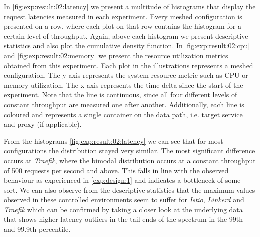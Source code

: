 In \cref{fig:exp:result:02:latency} we present a multitude of histograms that display the request latencies measured in each experiment. Every meshed configuration is presented on a row, where each plot on that row contains the histogram for a certain level of throughput. Again, above each histogram we present descriptive statistics and also plot the cumulative density function. In \cref{fig:exp:result:02:cpu} and \cref{fig:exp:result:02:memory} we present the resource utilization metrics obtained from this experiment. Each plot in the illustrations represents a meshed configuration. The y-axis represents the system resource metric such as CPU or memory utilization. The x-axis represents the time delta since the start of the experiment. Note that the line is continuous, since all four different levels of constant throughput are measured one after another. Additionally, each line is coloured and represents a single container on the data path, i.e. target service and proxy (if applicable).

From the histograms \cref{fig:exp:result:02:latency} we can see that for most configurations the distribution stayed very similar. The most significant difference occurs at \textit{Traefik}, where the bimodal distribution occurs at a constant throughput of 500 requests per second and above. This falls in line with the observed behaviour as experienced in \ref{exp:design:1} and indicates a bottleneck of some sort. We can also observe from the descriptive statistics that the maximum values observed in these controlled environments seem to suffer for \textit{Istio}, \textit{Linkerd} and \textit{Traefik} which can be confirmed by taking a closer look at the underlying data that shows higher latency outliers in the tail ends of the spectrum in the 99th and 99.9th percentile.


